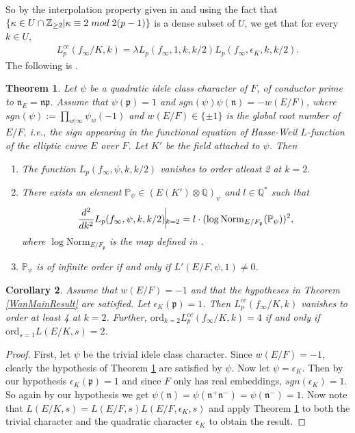 \documentclass[reqno,10pt]{amsart}
\newcommand{\q}{\mathbb{Q}}
\newcommand{\z}{\mathbb{Z}}
\newcommand{\p}{\mathfrak{p}}
\newcommand{\n}{\mathfrak{n}}
\theoremstyle{plain}
\newtheorem{thm}{Theorem}[section]
\newtheorem{cor}[thm]{Corollary}
\theoremstyle{definition}
\begin{document}
So by the interpolation property given in \cite{MokHeegnerPoints} and using the fact that $\{\kappa \in U \cap \z_{\geq 2} | \kappa \equiv 2 \hspace{1mm} mod \hspace{1mm} 2(p-1) \}$ is a dense subset of $U$, we get that for every $k \in U$,
\begin{align} \label{Central Critical in Terms of Mok}
    L_p^{cc}(f_\infty/K,k) = \lambda L_p(f_\infty,1,k,k/2) L_p(f_\infty,\epsilon_K,k,k/2).
\end{align}
The following is \cite[Theorem 5.4]{MokHeegnerPoints}.
\begin{thm}  \label{MokMainResult}
    Let $\psi$ be a quadratic idele class character of $F$, of conductor prime to $\n_E = \mathfrak{np}$. Assume that $\psi(\p) = 1$ and $sgn(\psi)\psi(\mathfrak{n}) = -w(E/F)$, where $sgn(\psi) := \prod_{w|\infty} \psi_w(-1)$ and $w(E/F) \in \{\pm 1\}$ is the global root number of $E/F$, i.e., the sign appearing in the functional equation of Hasse-Weil $L$-function of the elliptic curve $E$ over $F$. Let $K'$ be the field attached to $\psi$. Then
    \begin{enumerate}
        \item The function $L_p(f_\infty,\psi,k,k/2)$ vanishes to order atleast 2 at $k = 2$.
        \item There exists an element $\mathbb{P}_\psi \in (E(K') \otimes \q)_\psi$ and $l \in \q^*$ such that
        \begin{align*}
            \frac{d^2}{dk^2} L_p(f_\infty,\psi,k,k/2) \vline_{k=2} = l \cdot (\log\mathrm{Norm}_{E/F_\p}(\mathbb{P}_\psi))^2,
        \end{align*}
        where $\log\mathrm{Norm}_{E/F_\p}$ is the map defined in \cite[Section 4.5]{MokHeegnerPoints}.
        \item $\mathbb{P}_\psi$ is of infinite order if and only if $L'(E/F,\psi,1) \neq 0$.
    \end{enumerate}
\end{thm}

\begin{cor} \label{ineq1}
    Assume that $w(E/F) = -1$ and that the hypotheses in Theorem \ref{WanMainResult} are satisfied. Let $\epsilon_K(\p) = 1$. Then $L_p^{cc}(f_\infty/K,k)$ vanishes to order at least 4 at $k = 2$. Further, $\mathrm{ord}_{k=2} L_p^{cc}(f_\infty/K,k) = 4$ if and only if $\mathrm{ord}_{s=1}L(E/K,s) = 2$.
\end{cor}
\begin{proof}
    First, let $\psi$ be the trivial idele class character. Since $w(E/F) = -1$, clearly the hypothesis of Theorem \ref{MokMainResult} are satisfied by $\psi$. Now let $\psi = \epsilon_K$. Then by our hypothesis $\epsilon_K(\p) = 1$ and since $F$ only has real embeddings, $sgn(\epsilon_K) = 1$. So again by our hypothesis we get $\psi(\mathfrak{n}) = \psi(\mathfrak{n}^+ \mathfrak{n}^-) = \psi(\mathfrak{n}^-) = 1$. Now note that $L(E/K,s) = L(E/F,s)L(E/F,\epsilon_K,s)$ and apply Theorem \ref{MokMainResult} to both the trivial character and the quadratic character $\epsilon_K$ to obtain the result.
\end{proof}
\end{document}
